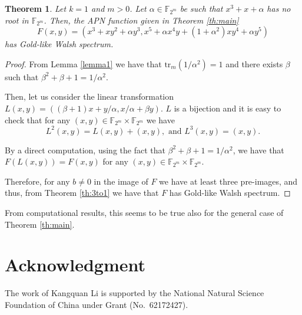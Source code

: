 \documentclass{article}
\newtheorem{theorem}{Theorem}
\newcommand{\tr}{\mathrm{tr}}
\begin{document}
\begin{theorem}
Let $k=1$ and $m>0$. Let $\alpha\in\mathbb{F}_{2^m}$ be such that $x^3+x+\alpha$ has no root in  $\mathbb{F}_{2^m}$. Then, the APN function given in Theorem \ref{th:main}
$$
F(x,y)=(x^3+xy^2+\alpha y^3,x^5+\alpha x^4y+(1+\alpha^2)xy^4+\alpha y^5)
$$ 
has Gold-like Walsh spectrum.
\end{theorem}
\begin{proof}
From Lemma \ref{lemma1} we have that $\tr_m(1/\alpha^2)=1$ and there exists $\beta$ such that $\beta^2+\beta+1=1/\alpha^2$.

Then, let us consider the linear transformation $L(x,y)=((\beta+1)x+y/\alpha,x/\alpha+\beta y)$. $L$ is a bijection and it is easy to check that 
for any $(x,y)\in\mathbb{F}_{2^m}\times\mathbb{F}_{2^m}$ we have
$$
L^2(x,y)=L(x,y)+(x,y), \text{ and }L^3(x,y)=(x,y).
$$

By a direct computation, using the fact that $\beta^2+\beta+1=1/\alpha^2$, we have that $F(L(x,y))=F(x,y)$ for any $(x,y)\in\mathbb{F}_{2^m}\times\mathbb{F}_{2^m}$. 

Therefore, for any $b\ne0$ in the image of $F$ we have at least three pre-images, and thus, from Theorem \ref{th:3to1} we have that $F$ has  Gold-like Walsh spectrum.
\end{proof}

From computational results, this seems to be true also for the general case of Theorem \ref{th:main}. 

\section{Acknowledgment}

 {The work of Kangquan Li is supported by the National Natural Science Foundation of China under Grant (No.~62172427).}
\end{document}
